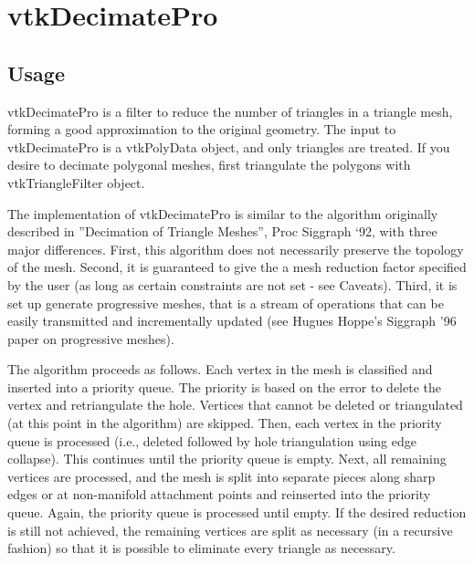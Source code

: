 \section{vtkDecimatePro}

\subsection{Usage}

 vtkDecimatePro is a filter to reduce the number of triangles in a triangle 
 mesh, forming a good approximation to the original geometry. The input to 
 vtkDecimatePro is a vtkPolyData object, and only triangles are treated. If 
 you desire to decimate polygonal meshes, first triangulate the polygons
 with vtkTriangleFilter object.
 
 The implementation of vtkDecimatePro is similar to the algorithm
 originally described in ''Decimation of Triangle Meshes'', Proc Siggraph
 `92, with three major differences. First, this algorithm does not
 necessarily preserve the topology of the mesh. Second, it is guaranteed to
 give the a mesh reduction factor specified by the user (as long as certain
 constraints are not set - see Caveats). Third, it is set up generate
 progressive meshes, that is a stream of operations that can be easily
 transmitted and incrementally updated (see Hugues Hoppe's Siggraph '96
 paper on progressive meshes).
 
 The algorithm proceeds as follows. Each vertex in the mesh is classified
 and inserted into a priority queue. The priority is based on the error to
 delete the vertex and retriangulate the hole. Vertices that cannot be
 deleted or triangulated (at this point in the algorithm) are
 skipped. Then, each vertex in the priority queue is processed (i.e.,
 deleted followed by hole triangulation using edge collapse). This
 continues until the priority queue is empty. Next, all remaining vertices
 are processed, and the mesh is split into separate pieces along sharp
 edges or at non-manifold attachment points and reinserted into the
 priority queue. Again, the priority queue is processed until empty. If
 the desired reduction is still not achieved, the remaining vertices are
 split as necessary (in a recursive fashion) so that it is possible to
 eliminate every triangle as necessary.
 
